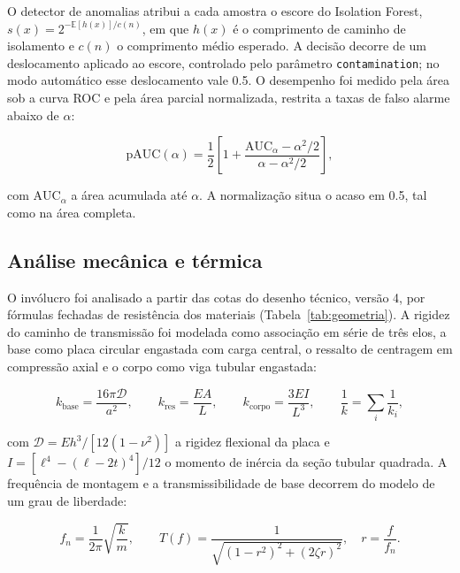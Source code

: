 \documentclass[11pt,a4paper]{article}
\begin{document}
O detector de anomalias atribui a cada amostra o escore do Isolation Forest,
$s(x) = 2^{-\mathbb{E}[h(x)]/c(n)}$, em que $h(x)$ é o comprimento de caminho de
isolamento e $c(n)$ o comprimento médio esperado. A decisão decorre de um deslocamento
aplicado ao escore, controlado pelo parâmetro \texttt{contamination}; no modo automático
esse deslocamento vale \num{0,5}. O desempenho foi medido pela área sob a curva ROC e
pela área parcial normalizada, restrita a taxas de falso alarme abaixo de $\alpha$:

\begin{equation}
\mathrm{pAUC}(\alpha) = \frac{1}{2}\left[1 + \frac{\mathrm{AUC}_\alpha - \alpha^2/2}{\alpha - \alpha^2/2}\right],
\label{eq:pauc}
\end{equation}

\noindent
com $\mathrm{AUC}_\alpha$ a área acumulada até $\alpha$. A normalização situa o acaso em
\num{0,5}, tal como na área completa.

\subsection{Análise mecânica e térmica}
\label{ssec:mecanica}

O invólucro foi analisado a partir das cotas do desenho técnico, versão 4, por fórmulas
fechadas de resistência dos materiais (Tabela~\ref{tab:geometria}). A rigidez do caminho
de transmissão foi modelada como associação em série de três elos, a base como placa
circular engastada com carga central, o ressalto de centragem em compressão axial e o
corpo como viga tubular engastada:

\begin{equation}
k_{\mathrm{base}} = \frac{16\pi \mathcal{D}}{a^2},
\qquad
k_{\mathrm{res}} = \frac{E A}{L},
\qquad
k_{\mathrm{corpo}} = \frac{3 E I}{L^3},
\qquad
\frac{1}{k} = \sum_i \frac{1}{k_i},
\label{eq:rigidez}
\end{equation}

\noindent
com $\mathcal{D} = E h^3 / [12(1-\nu^2)]$ a rigidez flexional da placa e
$I = [\ell^4 - (\ell-2t)^4]/12$ o momento de inércia da seção tubular quadrada. A
frequência de montagem e a transmissibilidade de base decorrem do modelo de um grau de
liberdade:

\begin{equation}
f_n = \frac{1}{2\pi}\sqrt{\frac{k}{m}},
\qquad
T(f) = \frac{1}{\sqrt{\left(1-r^2\right)^2 + \left(2\zeta r\right)^2}},
\quad r = \frac{f}{f_n}.
\label{eq:transmissibilidade}
\end{equation}
\end{document}
